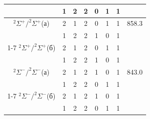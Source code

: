 \documentclass[12pt]{extarticle}
\begin{document}
\begin{table}[H]
\begin{tabular}{|c|cccccc|c|}
    		& 1                                       & 2                                       & 2                                       & 0                                      & 1                                      & 1                 &                  \\ \hline
    		$^2\Sigma^+/^2\Sigma^+$(а) & 2                                       & 1                                       & 2                                       & 0                                      & 1                                      & 1                 & 858.3            \\
    		& 1                                       & 2                                       & 2                                       & 1                                      & 0                                      & 1                 &                  \\ \cline{1-7}
    		$^2\Sigma^+/^2\Sigma^+$(б) & 2                                       & 1                                       & 2                                       & 0                                      & 1                                      & 1                 &                  \\
    		& 1                                       & 2                                       & 2                                       & 1                                      & 0                                      & 1                 &                  \\ \hline
    		$^2\Sigma^-/^2\Sigma^-$(а) & 2                                       & 1                                       & 2                                       & 1                                      & 0                                      & 1                 & 843.0            \\
    		& 1                                       & 2                                       & 2                                       & 0                                      & 1                                      & 1                 &                  \\ \cline{1-7}
    		$^2\Sigma^-/^2\Sigma^-$(б) & 2                                       & 1                                       & 2                                       & 1                                      & 0                                      & 1                 &                  \\
    		& 1                                       & 2                                       & 2                                       & 0                                      & 1                                      & 1                 &                  \\ \hline

\end{tabular}
\end{table}
\end{document}
